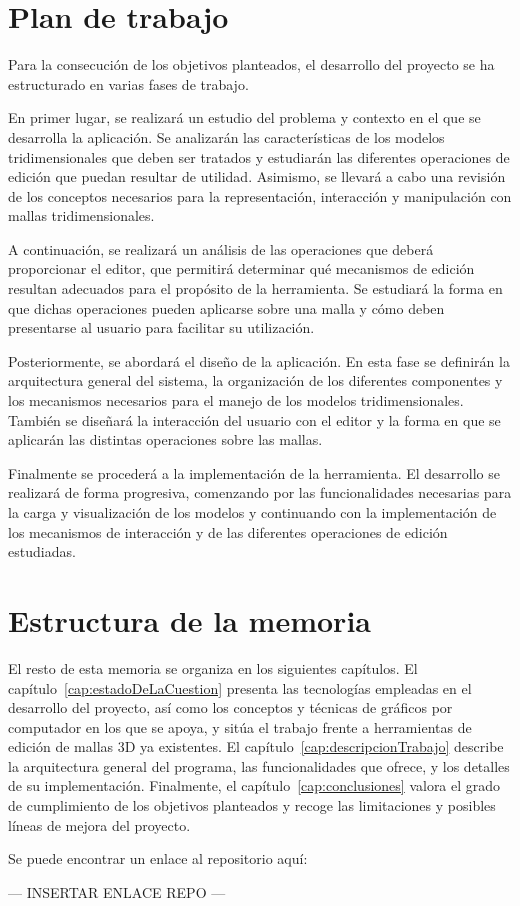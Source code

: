 \section{Plan de trabajo}

Para la consecución de los objetivos planteados, el desarrollo del proyecto se ha estructurado en varias fases de trabajo.

En primer lugar, se realizará un estudio del problema y contexto en el que se desarrolla la aplicación. Se analizarán las características de los modelos tridimensionales que deben ser tratados y estudiarán las diferentes operaciones de edición que puedan resultar de utilidad. Asimismo, se llevará a cabo una revisión de los conceptos necesarios para la representación, interacción y manipulación con mallas tridimensionales.

A continuación, se realizará un análisis de las operaciones que deberá proporcionar el editor, que permitirá determinar qué mecanismos de edición resultan adecuados para el propósito de la herramienta. Se estudiará la forma en que dichas operaciones pueden aplicarse sobre una malla y cómo deben presentarse al usuario para facilitar su utilización.

Posteriormente, se abordará el diseño de la aplicación. En esta fase se definirán la arquitectura general del sistema, la organización de los diferentes componentes y los mecanismos necesarios para el manejo de los modelos tridimensionales. También se diseñará la interacción del usuario con el editor y la forma en que se aplicarán las distintas operaciones sobre las mallas.

Finalmente se procederá a la implementación de la herramienta. El desarrollo se realizará de forma progresiva, comenzando por las funcionalidades necesarias para la carga y visualización de los modelos y continuando con la implementación de los mecanismos de interacción y de las diferentes operaciones de edición estudiadas.

\section{Estructura de la memoria}

El resto de esta memoria se organiza en los siguientes capítulos. El capítulo~\ref{cap:estadoDeLaCuestion} presenta las tecnologías empleadas en el desarrollo del proyecto, así como los conceptos y técnicas de gráficos por computador en los que se apoya, y sitúa el trabajo frente a herramientas de edición de mallas 3D ya existentes. El capítulo~\ref{cap:descripcionTrabajo} describe la arquitectura general del programa, las funcionalidades que ofrece, y los detalles de su implementación. Finalmente, el capítulo~\ref{cap:conclusiones} valora el grado de cumplimiento de los objetivos planteados y recoge las limitaciones y posibles líneas de mejora del proyecto.

Se puede encontrar un enlace al repositorio aquí:

--- INSERTAR ENLACE REPO ---